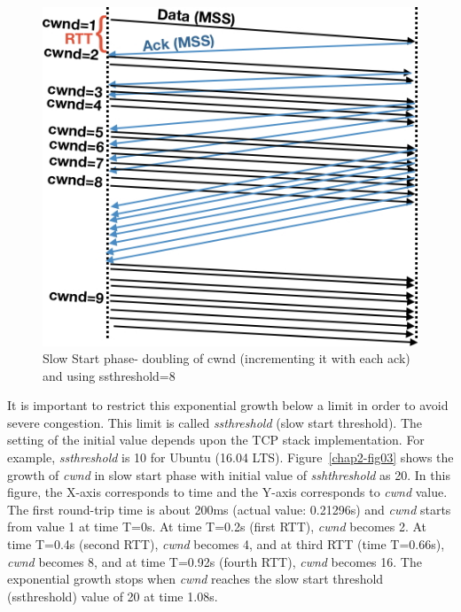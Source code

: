 \begin{multicols}{2}
\begin{figure}[H]
\centering
\includegraphics[scale=2]{src/Figures/chap2/chap2-fig02.jpg}
\caption{Slow Start phase- doubling of cwnd (incrementing it with each ack) and using ssthreshold=8}\label{chap2-fig02}
\end{figure}

It is important to restrict this exponential growth below a limit in order to avoid severe congestion. This limit is called \textit{ssthreshold} (slow start threshold). The setting of the initial value depends upon the TCP stack implementation. For example, \textit{ssthreshold} is 10 for Ubuntu (16.04 LTS). Figure~\ref{chap2-fig03} shows the growth of \textit{cwnd} in slow start phase with initial value of \textit{sshthreshold} as 20. In this figure, the X-axis corresponds to time and the Y-axis corresponds to \textit{cwnd} value. The first round-trip time is about 200ms (actual value: 0.21296s) and \textit{cwnd} starts from value 1 at time T=0s. At time T=0.2s (first RTT), \textit{cwnd} becomes 2. At time T=0.4s (second RTT), \textit{cwnd} becomes 4, and at third RTT (time T=0.66s), \textit{cwnd} becomes 8, and at time T=0.92s (fourth RTT), \textit{cwnd} becomes 16. The exponential growth stops when \textit{cwnd} reaches the slow start threshold (ssthreshold) value of 20 at time 1.08s. 


\end{multicols}

